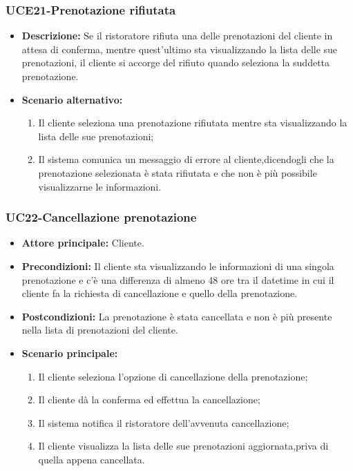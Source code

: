 \subsubsection{UCE21-Prenotazione rifiutata}
\begin{itemize}
    \item \textbf{Descrizione: }Se il ristoratore rifiuta una delle prenotazioni del cliente in attesa di conferma,
    mentre quest'ultimo sta visualizzando la lista delle sue prenotazioni, il cliente si accorge del rifiuto quando
    seleziona la suddetta prenotazione.
    \item \textbf{Scenario alternativo: }
    \begin{enumerate}
        \item Il cliente seleziona una prenotazione rifiutata mentre sta visualizzando la lista
        delle sue prenotazioni;
        \item Il sistema comunica un messaggio di errore al cliente,dicendogli che la prenotazione selezionata
        è stata rifiutata e che non è più possibile visualizzarne le informazioni.
    \end{enumerate}
\end{itemize}

\subsubsection{UC22-Cancellazione prenotazione}
\begin{itemize}
    \item \textbf{Attore principale: } Cliente.
    \item \textbf{Precondizioni: }Il cliente sta visualizzando le informazioni di una singola prenotazione
    e c'è una differenza di almeno 48 ore tra il datetime in cui il cliente fa la richiesta di cancellazione e quello della prenotazione.
    \item \textbf{Postcondizioni: }La prenotazione è stata cancellata e non è più presente nella lista di prenotazioni
    del cliente.
    \item \textbf{Scenario principale:}
        \begin{enumerate}
            \item Il cliente seleziona l'opzione di cancellazione della prenotazione;
            \item Il cliente dà la conferma ed effettua la cancellazione;
            \item Il sistema notifica il ristoratore dell'avvenuta cancellazione;
            \item Il cliente visualizza la lista delle sue prenotazioni aggiornata,priva di quella appena
            cancellata.
        \end{enumerate}
\end{itemize}

